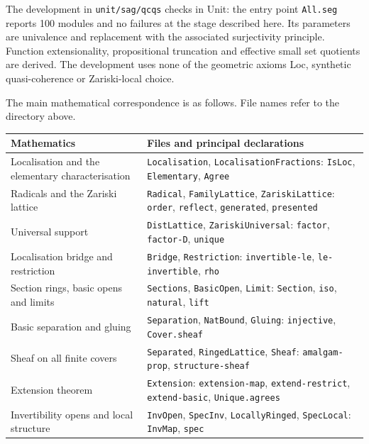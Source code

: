 \documentclass[11pt]{amsart}
\theoremstyle{definition}
\theoremstyle{remark}
\begin{document}
The development in \texttt{unit/sag/qcqs} checks in Unit: the entry point
\texttt{All.seg} reports 100 modules and no failures at the stage described
here. Its parameters are univalence and replacement with the associated
surjectivity principle. Function extensionality, propositional truncation
and effective small set quotients are derived. The development uses none
of the geometric axioms Loc, synthetic quasi-coherence or Zariski-local
choice.

The main mathematical correspondence is as follows. File names refer to
the directory above.

\small
\begin{longtable}{@{}>{\raggedright\arraybackslash}p{}>{\raggedright\arraybackslash}p{}@{}}
\textbf{Mathematics}&\textbf{Files and principal declarations}\\\hline
Localisation and the elementary characterisation&
\texttt{Localisation}, \texttt{LocalisationFractions}:
\texttt{IsLoc}, \texttt{Elementary}, \texttt{Agree}\\[4pt]
Radicals and the Zariski lattice&
\texttt{Radical}, \texttt{FamilyLattice}, \texttt{ZariskiLattice}:
\texttt{order}, \texttt{reflect}, \texttt{generated}, \texttt{presented}\\[4pt]
Universal support&
\texttt{DistLattice}, \texttt{ZariskiUniversal}:
\texttt{factor}, \texttt{factor-D}, \texttt{unique}\\[4pt]
Localisation bridge and restriction&
\texttt{Bridge}, \texttt{Restriction}:
\texttt{invertible-le}, \texttt{le-invertible}, \texttt{rho}\\[4pt]
Section rings, basic opens and limits&
\texttt{Sections}, \texttt{BasicOpen}, \texttt{Limit}:
\texttt{Section}, \texttt{iso}, \texttt{natural}, \texttt{lift}\\[4pt]
Basic separation and gluing&
\texttt{Separation}, \texttt{NatBound}, \texttt{Gluing}:
\texttt{injective}, \texttt{Cover.sheaf}\\[4pt]
Sheaf on all finite covers&
\texttt{Separated}, \texttt{RingedLattice}, \texttt{Sheaf}:
\texttt{amalgam-prop}, \texttt{structure-sheaf}\\[4pt]
Extension theorem&
\texttt{Extension}:
\texttt{extension-map}, \texttt{extend-restrict},
\texttt{extend-basic}, \texttt{Unique.agrees}\\[4pt]
Invertibility opens and local structure&
\texttt{InvOpen}, \texttt{SpecInv}, \texttt{LocallyRinged},
\texttt{SpecLocal}: \texttt{InvMap}, \texttt{spec}\\[4pt]

\end{longtable}
\end{document}
